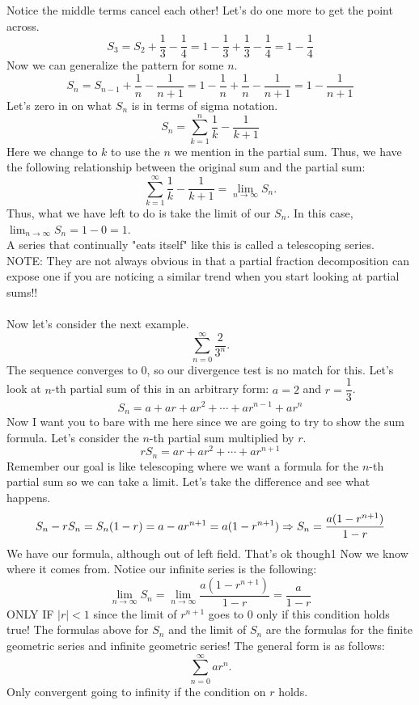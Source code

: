 \documentclass[10pt]{article}
\newcommand{\ds}{\displaystyle}
\theoremstyle{Theorem}
\theoremstyle{definition}
\theoremstyle{remark}
\theoremstyle{custom}
\begin{document}
Notice the middle terms cancel each other! Let's do one more to get the point across.
\[
S_3=S_2+\dfrac{1}{3}-\dfrac{1}{4}=1-\dfrac{1}{3}+\dfrac{1}{3}-\dfrac{1}{4}=1-\dfrac{1}{4}
\]
Now we can generalize the pattern for some $n$.
\[
S_n=S_{n-1}+\dfrac{1}{n}-\dfrac{1}{n+1}=1-\dfrac{1}{n}+\dfrac{1}{n}-\dfrac{1}{n+1}=1-\dfrac{1}{n+1}
\]
Let's zero in on what $S_n$ is in terms of sigma notation.
\[
S_n=\sum_{k=1}^{n}\dfrac{1}{k}-\dfrac{1}{k+1}
\]
Here we change to $k$ to use the $n$ we mention in the partial sum. Thus, we have the following relationship between the original sum and the partial sum:
\[
\sum_{k=1}^{\infty}\dfrac{1}{k}-\dfrac{1}{k+1}=\lim_{n\rightarrow \infty}S_n.
\]
Thus, what we have left to do is take the limit of our $S_n$. In this case, $\ds \lim_{n\rightarrow \infty} S_n=1-0=1$.\\
A series that continually "eats itself" like this is called a telescoping series.\\
NOTE: They are not always obvious in that a partial fraction decomposition can expose one if you are noticing a similar trend when you start looking at partial sums!!\\\\
\newpage
Now let's consider the next example.
\[
\sum_{n=0}^{\infty}\dfrac{2}{3^n}.
\]
The sequence converges to 0, so our divergence test is no match for this. Let's look at $n$-th partial sum of this in an arbitrary form: $a=2$ and $r=\dfrac{1}{3}$.
\[
S_n=a+ar+ar^2+\cdots +ar^{n-1}+ar^n
\]
Now I want you to bare with me here since we are going to try to show the sum formula. Let's consider the $n$-th partial sum multiplied by $r$.
\[
rS_n=ar+ar^2+\cdots +ar^{n+1}
\]
Remember our goal is like telescoping where we want a formula for the $n$-th partial sum so we can take a limit. Let's take the difference and see what happens.
\[
S_n-rS_n=S_n(1-r)=a-ar^{n+1}=a(1-r^{n+1})\\
\Rightarrow S_n=\dfrac{a(1-r^{n+1})}{1-r}
\]
We have our formula, although out of left field. That's ok though1 Now we know where it comes from. Notice our infinite series is the following:
\[
\lim_{n\rightarrow \infty} S_n=\lim_{n\rightarrow \infty}\dfrac{a(1-r^{n+1})}{1-r}=\dfrac{a}{1-r}
\]
ONLY IF $|r|<1$ since the limit of $r^{n+1}$ goes to 0 only if this condition holds true! 
The formulas above for $S_n$ and the limit of $S_n$ are the formulas for the finite geometric series and infinite geometric series! The general form is as follows:
\[
\sum_{n=0}^{\infty}ar^n.
\]
Only convergent going to infinity if the condition on $r$ holds.\\
\end{document}
